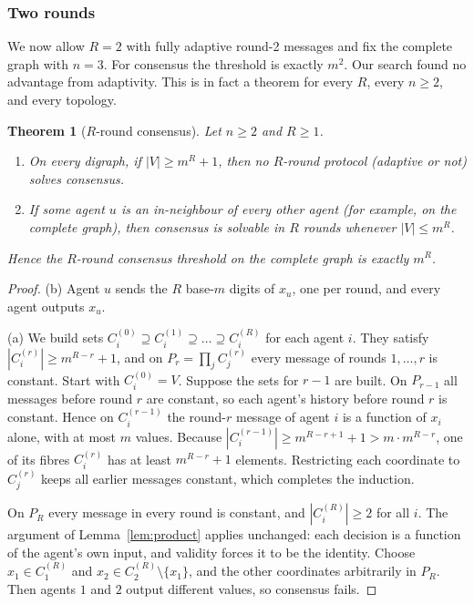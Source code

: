 \documentclass[11pt]{article}
\newtheorem{theorem}{Theorem}
\begin{document}
\subsubsection{Two rounds}

We now allow $R=2$ with fully adaptive round-2 messages and fix the complete graph with $n=3$. For consensus the threshold is exactly $m^2$. Our search found no advantage from adaptivity. This is in fact a theorem for every $R$, every $n\ge 2$, and every topology.

\begin{theorem}[$R$-round consensus]\label{thm:cons-R}
Let $n\ge2$ and $R\ge1$.
\begin{enumerate}
\item[(a)] On every digraph, if $|V|\ge m^R+1$, then no $R$-round protocol (adaptive or not) solves consensus.
\item[(b)] If some agent $u$ is an in-neighbour of every other agent (for example, on the complete graph), then consensus is solvable in $R$ rounds whenever $|V|\le m^R$.
\end{enumerate}
Hence the $R$-round consensus threshold on the complete graph is exactly $m^R$.
\end{theorem}
\begin{proof}
(b) Agent $u$ sends the $R$ base-$m$ digits of $x_u$, one per round, and every agent outputs $x_u$.

(a) We build sets $C^{(0)}_i\supseteq C^{(1)}_i\supseteq\dots\supseteq C^{(R)}_i$ for each agent $i$. They satisfy $|C^{(r)}_i|\ge m^{R-r}+1$, and on $P_r=\prod_j C^{(r)}_j$ every message of rounds $1,\dots,r$ is constant. Start with $C^{(0)}_i=V$. Suppose the sets for $r-1$ are built. On $P_{r-1}$ all messages before round $r$ are constant, so each agent's history before round $r$ is constant. Hence on $C^{(r-1)}_i$ the round-$r$ message of agent $i$ is a function of $x_i$ alone, with at most $m$ values. Because $|C^{(r-1)}_i|\ge m^{R-r+1}+1>m\cdot m^{R-r}$, one of its fibres $C^{(r)}_i$ has at least $m^{R-r}+1$ elements. Restricting each coordinate to $C^{(r)}_j$ keeps all earlier messages constant, which completes the induction.

On $P_R$ every message in every round is constant, and $|C^{(R)}_i|\ge2$ for all $i$. The argument of Lemma~\ref{lem:product} applies unchanged: each decision is a function of the agent's own input, and validity forces it to be the identity. Choose $x_1\in C^{(R)}_1$ and $x_2\in C^{(R)}_2\setminus\{x_1\}$, and the other coordinates arbitrarily in $P_R$. Then agents $1$ and $2$ output different values, so consensus fails.
\end{proof}
\end{document}

